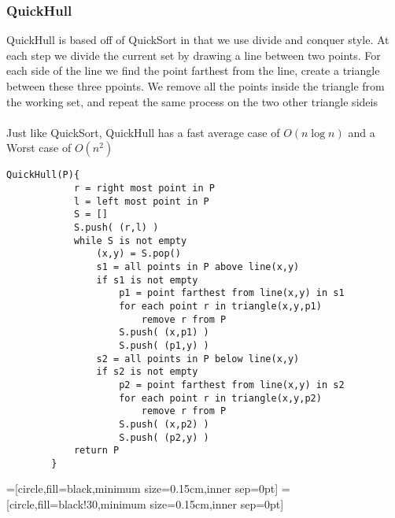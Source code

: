 \documentclass{article}
\begin{document}
		\subsubsection{QuickHull}
		QuickHull is based off of QuickSort in that we use divide and conquer style. At each step we divide the current set by drawing a line between two points. For each side of the line we find the point farthest from the line, create a triangle between these three ppoints. We remove all the points inside the triangle from the working set, and repeat the same process on the two other triangle sideis
		\\ \\
		Just like QuickSort, QuickHull has a fast average case of $O(n \log n)$ and a Worst case of $O(n^2)$

		\begin{lstlisting}[style=pseudo]
		QuickHull(P){
			r = right most point in P
			l = left most point in P
			S = []
			S.push( (r,l) )
			while S is not empty
				(x,y) = S.pop()
				s1 = all points in P above line(x,y)
				if s1 is not empty
					p1 = point farthest from line(x,y) in s1
					for each point r in triangle(x,y,p1)
						remove r from P
					S.push( (x,p1) )
					S.push( (p1,y) )
				s2 = all points in P below line(x,y)
				if s2 is not empty
					p2 = point farthest from line(x,y) in s2
					for each point r in triangle(x,y,p2)
						remove r from P
					S.push( (x,p2) )
					S.push( (p2,y) )
			return P
		}
		\end{lstlisting}

		=[circle,fill=black,minimum size=0.15cm,inner sep=0pt]
		=[circle,fill=black!30,minimum size=0.15cm,inner sep=0pt]
		\hspace{2cm}
\end{document}
